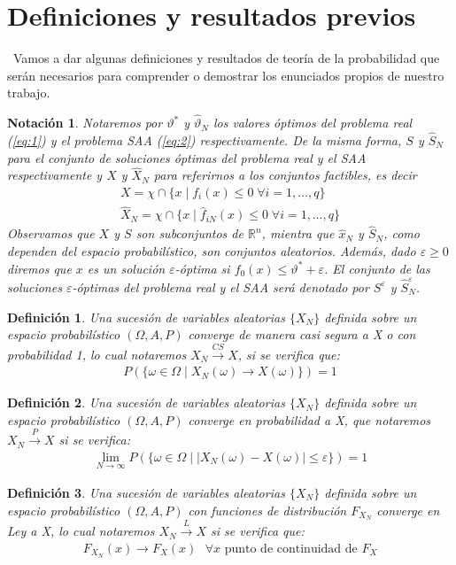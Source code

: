 \documentclass[twoside,a4paper,openright,12pt]{book}
\newtheorem{defi}{Definici\'on}[section]
\newtheorem{notac}{Notación}[section]
\providecommand{\abs}[1]{\left|{#1}\right|}
\providecommand{\conv}[1]{\overset{#1}{\longrightarrow}}
\providecommand{\convcs}{\xrightarrow{CS}}
\newcommand{\R}{\mathbb{R}}
\begin{document}
\section{Definiciones y resultados previos}
\
Vamos a dar algunas definiciones y resultados de teoría de la probabilidad que serán necesarios para comprender o demostrar los enunciados propios de nuestro trabajo.
\begin{notac}
Notaremos por $\vartheta^*$ y $\hat{\vartheta}_N$ los valores óptimos del problema real (\ref{eq:1}) y el problema SAA (\ref{eq:2}) respectivamente. De la misma forma, $S$ y $\hat{S}_N$ para el conjunto de soluciones óptimas del problema real y el SAA respectivamente y $X$ y $\hat{X}_N$ para referirnos a los conjuntos factibles, es decir
\begin{gather*}
X=\chi\cap\{x\mid f_i(x)\leq 0 \;\forall i=1,\dotsc,q\}\\
\hat{X}_N=\chi\cap\{x\mid \hat{f}_{iN}(x)\leq 0 \;\forall i=1,\dotsc,q\}
\end{gather*} 
Observamos que $X$ y $S$ son subconjuntos de $\R^n$, mientra que $\hat{x}_N$ y $\hat{S}_N$, como dependen del espacio probabilístico, son conjuntos aleatorios.
 Además, dado $\varepsilon\geq 0$ diremos que $x$ es un solución $\varepsilon$-óptima si $f_0(x)\leq \vartheta^*+\varepsilon$. El conjunto de las soluciones $\varepsilon$-óptimas del problema real y el SAA será denotado por $S^\varepsilon$ y $\hat{S}^\varepsilon_N$.
\end{notac}
\begin{defi}
Una sucesión de variables aleatorias $\{X_N\}$ definida sobre un espacio probabilístico $(\Omega,A,P)$ converge de manera casi segura a X o con probabilidad 1, lo cual notaremos $X_N \convcs X$, si se verifica que:
\begin{gather*}
P\left(\{\omega\in\Omega \mid X_N(\omega)\longrightarrow X(\omega)\}\right)=1
\end{gather*}
\end{defi}
\begin{defi}
Una sucesión de variables aleatorias $\{X_N\}$ definida sobre un espacio probabilístico $(\Omega,A,P)$ converge en probabilidad a X, que notaremos ${X_N \conv{P} X}$ si se verifica:
\begin{gather*}
\lim_{N\to\infty}P\left(\{\omega\in\Omega \mid \abs{X_N(\omega)-X(\omega)}\leq \varepsilon \}\right)=1
\end{gather*}
\end{defi}
\begin{defi}
Una sucesión de variables aleatorias $\{X_N\}$ definida sobre un espacio probabilístico $(\Omega,A,P)$ con funciones de distribución $F_{X_N}$ converge en Ley a X, lo cual notaremos $X_N \conv{L} X$ si se verifica que:
\begin{gather*}
F_{X_N}(x)\longrightarrow F_X(x)\text{ $\forall x$ punto de continuidad de $F_X$}
\end{gather*}
\end{defi}
\end{document}
